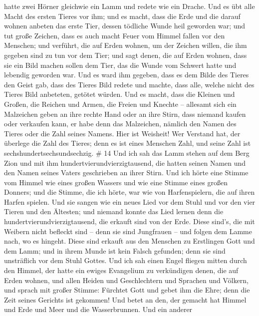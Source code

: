 hatte zwei Hörner gleichwie ein Lamm und redete wie ein Drache.
 Und es übt alle Macht des ersten Tieres vor ihm; und es
macht, dass die Erde und die darauf wohnen anbeten das erste Tier,
dessen tödliche Wunde heil geworden war;  und tut große
Zeichen, dass es auch macht Feuer vom Himmel fallen vor den Menschen;
 und verführt, die auf Erden wohnen, um der Zeichen willen,
die ihm gegeben sind zu tun vor dem Tier; und sagt denen, die auf Erden
wohnen, dass sie ein Bild machen sollen dem Tier, das die Wunde vom
Schwert hatte und lebendig geworden war.  Und es ward ihm
gegeben, dass es dem Bilde des Tieres den Geist gab, dass des Tieres
Bild redete und machte, dass alle, welche nicht des Tieres Bild
anbeteten, getötet würden.  Und es macht, dass die Kleinen
und Großen, die Reichen und Armen, die Freien und Knechte -- allesamt
sich ein Malzeichen geben an ihre rechte Hand oder an ihre Stirn,
 dass niemand kaufen oder verkaufen kann, er habe denn das
Malzeichen, nämlich den Namen des Tieres oder die Zahl seines Namens.
 Hier ist Weisheit! Wer Verstand hat, der überlege die Zahl
des Tieres; denn es ist eines Menschen Zahl, und seine Zahl ist
sechshundertsechsundsechzig. \# 14  Und ich sah das Lamm
stehen auf dem Berg Zion und mit ihm hundertvierundvierzigtausend, die
hatten seinen Namen und den Namen seines Vaters geschrieben an ihrer
Stirn.  Und ich hörte eine Stimme vom Himmel wie eines
großen Wassers und wie eine Stimme eines großen Donners; und die Stimme,
die ich hörte, war wie von Harfenspielern, die auf ihren Harfen spielen.
 Und sie sangen wie ein neues Lied vor dem Stuhl und vor den
vier Tieren und den Ältesten; und niemand konnte das Lied lernen denn
die hundertvierundvierzigtausend, die erkauft sind von der Erde.
 Diese sind's, die mit Weibern nicht befleckt sind -- denn
sie sind Jungfrauen -- und folgen dem Lamme nach, wo es hingeht. Diese
sind erkauft aus den Menschen zu Erstlingen Gott und dem Lamm;
 und in ihrem Munde ist kein Falsch gefunden; denn sie sind
unsträflich vor dem Stuhl Gottes.  Und ich sah einen Engel
fliegen mitten durch den Himmel, der hatte ein ewiges Evangelium zu
verkündigen denen, die auf Erden wohnen, und allen Heiden und
Geschlechtern und Sprachen und Völkern,  und sprach mit
großer Stimme: Fürchtet Gott und gebet ihm die Ehre; denn die Zeit
seines Gerichts ist gekommen! Und betet an den, der gemacht hat Himmel
und Erde und Meer und die Wasserbrunnen.  Und ein anderer

